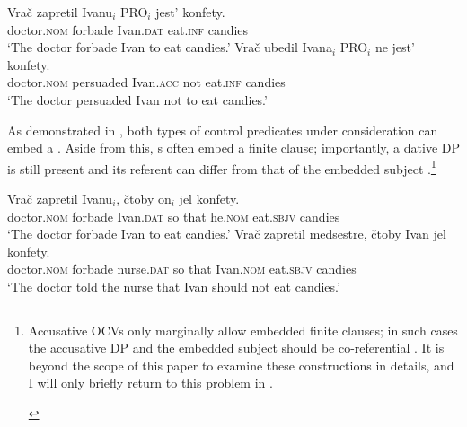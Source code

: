 \documentclass[output=paper,colorlinks,citecolor=brown,newtxmath]{langsci/langscibook}
\begin{document}
\begin{exe}
\ex\label{ex3} \begin{xlist}
\ex\label{ex3a}
\gll Vrač zapretil Ivanu$_i$ PRO$_i$ jest’ konfety.\\
    doctor.\textsc{nom} forbade Ivan.\textsc{dat} {} eat.\textsc{inf} candies \\
\glt `The doctor forbade Ivan to eat candies.'
\ex\label{ex3b}
\gll Vrač ubedil Ivana$_i$ PRO$_i$ ne jest’ konfety.\\
    doctor.\textsc{nom} persuaded Ivan.\textsc{acc} {} not eat.\textsc{inf} candies \\
\glt `The doctor persuaded Ivan not to eat candies.'
    \end{xlist}
\end{exe}

\noindent As demonstrated in , both types of control predicates under consideration can embed a . Aside from this, s often embed a finite  clause; importantly, a {dative} DP is still present and its referent can differ from that of the embedded subject .\footnote{
Accusative OCVs only marginally allow embedded finite clauses; in such cases the accusative DP and the embedded subject should be co-referential . It is beyond the scope of this paper to examine these constructions in details, and I will only briefly return to this problem in .

\begin{exe}
\ex\label{ex0} \begin{xlist}
    \end{xlist}
\end{exe}
}

\begin{exe}
\ex\label{ex4} \begin{xlist}
\ex\label{ex4a}
\gll Vrač zapretil Ivanu$_i$, čtoby on$_i$ jel konfety.\\
    doctor.\textsc{nom} forbade Ivan.\textsc{dat} {so that} he.\textsc{nom} eat.\textsc{sbjv} candies \\
\glt `The doctor forbade Ivan to eat candies.'
\ex\label{ex4b}
\gll Vrač zapretil medsestre, čtoby Ivan jel konfety.\\
    doctor.\textsc{nom} forbade nurse.\textsc{dat} {so that} Ivan.\textsc{nom} eat.\textsc{sbjv} candies \\
\glt `The doctor told the nurse that Ivan should not eat candies.'
    \end{xlist}
\end{exe}
\end{document}
